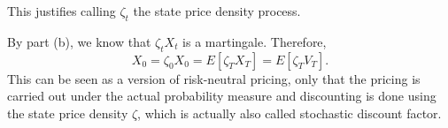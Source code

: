 \documentclass[handout,8pt]{beamer}
\begin{document}
\begin{frame}[allowframebreaks]{ }
\begin{enumerate}
\begin{enumerate}
        This justifies calling $\zeta_t$ the state price density process. \newline
        
        By part (b), we know that $\zeta_tX_t$ is a martingale. Therefore,
        \begin{equation*}
            X_0=\zeta_0X_0 =E[\zeta_T X_T] = E[\zeta_T V_T].
        \end{equation*}
        This can be seen as a version of risk-neutral pricing, only that the pricing is carried out under the actual probability measure and discounting is done using the state price density $\zeta$, which is actually also called stochastic discount factor.
    \end{enumerate}
    
\end{enumerate}




\end{frame}
\end{document}

